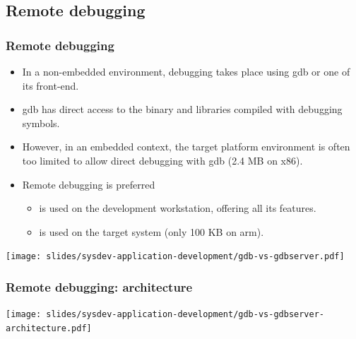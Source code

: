 \subsection{Remote debugging}

\begin{frame}
  \frametitle{Remote debugging}
  \begin{itemize}
  \item In a non-embedded environment, debugging takes place using gdb
    or one of its front-end.
  \item gdb has direct access to the binary and libraries compiled
    with debugging symbols.
  \item However, in an embedded context, the target platform
    environment is often too limited to allow direct debugging with
    gdb (2.4 MB on x86).
  \item Remote debugging is preferred
    \begin{itemize}
    \item {} is used on the development workstation, offering
      all its features.
    \item {} is used on the target system (only 100 KB
      on arm).
    \end{itemize}
  \end{itemize}
  \begin{center}
    \texttt{[image: slides/sysdev-application-development/gdb-vs-gdbserver.pdf]}
  \end{center}
\end{frame}

\begin{frame}
  \frametitle{Remote debugging: architecture}
  \begin{center}
    \texttt{[image: slides/sysdev-application-development/gdb-vs-gdbserver-architecture.pdf]}
  \end{center}
\end{frame}

